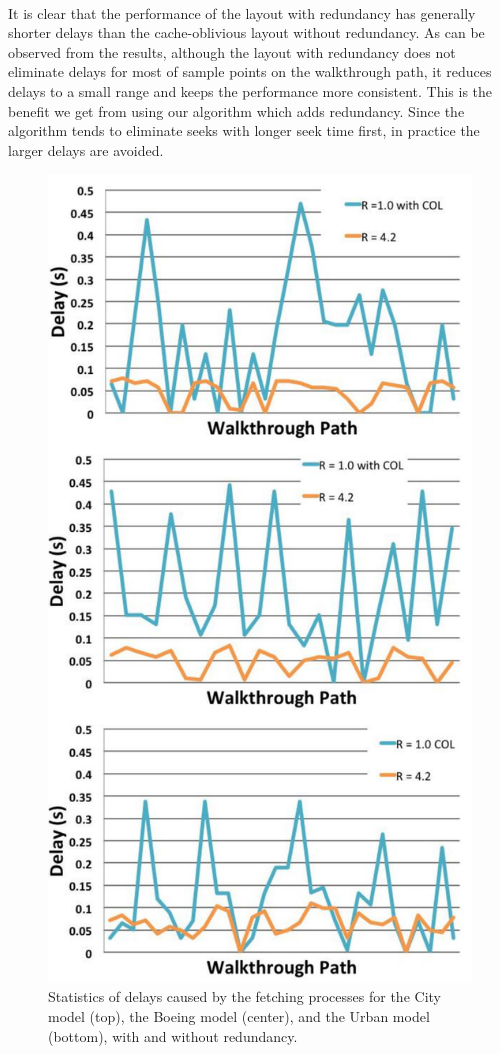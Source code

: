 \\
It is clear that the performance of the layout with redundancy has generally shorter delays than the cache-oblivious layout without redundancy. As can be observed from the results, although the layout with redundancy does not eliminate delays for most of sample points on the walkthrough path, it reduces delays to a small range and keeps the performance more consistent. This is the benefit we get from using our algorithm which adds redundancy. Since the algorithm tends to eliminate seeks with longer seek time first, in practice the larger delays are avoided.
\begin{figure}[h!]
\centering
\includegraphics[width=\columnwidth]
{comparison_to_COL_all.pdf}
  \caption{Statistics of delays caused by the fetching processes for the City model (top), the Boeing model (center), and
the Urban model (bottom), with and without redundancy. }
  \label{fig:resultall}
\end{figure} 

